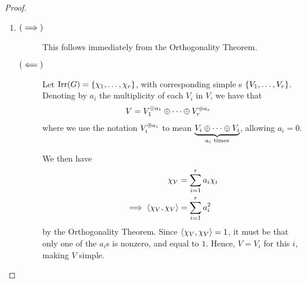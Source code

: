 \begin{proof}
\begin{enumerate}[label = \normalfont \arabic*.]
        \item 
        \begin{description}
            \item[$\left( \implies \right)$] This follows immediately from the Orthogonality Theorem.
            \item[$\left( \impliedby \right)$] Let $\operatorname{Irr}\!\left( G \right) = \left\{ \chi_1, \ldots, \chi_r \right\}$, with corresponding simple \CGM s $\left\{ V_1, \ldots, V_r \right\}$. Denoting by $a_i$ the multiplicity of each $V_i$ in $V$, we have that
            \begin{align}
                V &= V_1^{\oplus a_1} \oplus \cdots \oplus V_r^{\oplus a_r}
                \label{Ch2:Eq:Simple_Mod_Decomp_Supscr_Not}
            \end{align}
            where we use the notation $V_i^{\oplus a_i}$ to mean $\underbrace{V_i \oplus \cdots \oplus V_i}_{a_i \text{ times}}$, allowing $a_i = 0$.

            We then have
            \begin{align*}
                \chi_V &= \sum_{i=1}^{r} a_i \chi_i \\
                \implies \left\langle \chi_V, \chi_V \right\rangle &= \sum_{i=1}^{r} a_i^2
            \end{align*}
            by the Orthogonality Theorem. Since $\left\langle \chi_V, \chi_V \right\rangle = 1$, it must be that only one of the $a_i$s is nonzero, and equal to $1$. Hence, $V = V_i$ for this $i$, making $V$ simple.
        \end{description}
    \end{enumerate}
\end{proof}

